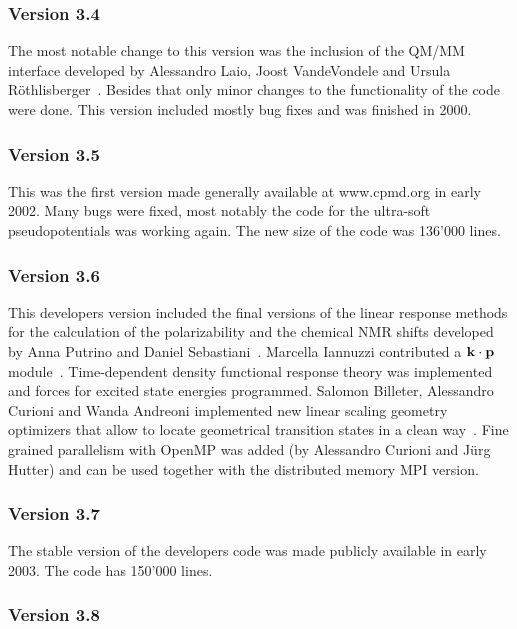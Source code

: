 \documentclass[twoside,10pt,titlepage,a4paper]{article}
\begin{document}
\subsubsection{Version 3.4}

  The most notable change to this version was the inclusion of the QM/MM
interface developed by Alessandro Laio, Joost VandeVondele and Ursula
R\"othlisberger~\cite{qmmm02,qmmm03,qmmm04}. 
Besides that only minor changes to the functionality of the
code were done. This version included mostly bug fixes and was finished in
2000.

\subsubsection{Version 3.5}

  This was the first version made generally available at www.cpmd.org in early
2002. Many bugs were fixed, most notably the code for the ultra-soft
pseudopotentials was working again. The new size of the code was 136'000 lines.

\subsubsection{Version 3.6}

  This developers version included the final versions of the linear response
methods for the calculation of the polarizability and the chemical NMR shifts
developed by Anna Putrino and Daniel Sebastiani~\cite{apdsmp,apmp,dsmp}. 
Marcella Iannuzzi contributed a ${\bf k} \cdot {\bf p}$ module~\cite{mimp}.
Time-dependent density functional response theory was
implemented and forces for excited state energies programmed.
Salomon Billeter, Alessandro Curioni and Wanda Andreoni implemented
new linear scaling geometry optimizers that allow to locate geometrical
transition states in a clean way~\cite{LSCAL}.
Fine grained parallelism with OpenMP was added (by Alessandro Curioni
and J\"urg Hutter) and can be used together with the distributed
memory MPI version.

\subsubsection{Version 3.7}

  The stable version of the developers code was made publicly available in
early 2003. The code has 150'000 lines.

\subsubsection{Version 3.8}
\end{document}
